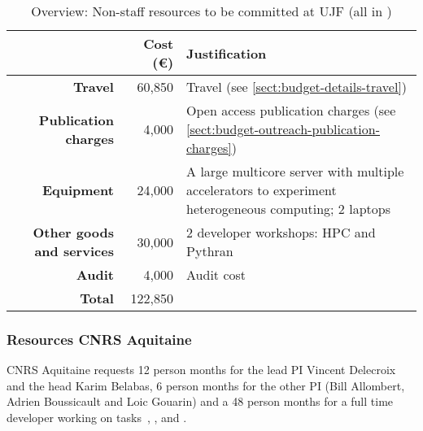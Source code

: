 \bigskip
\begin{table}[H]
\begin{tabular}{|r|r|p{9cm}|}
\hline
\textbf{} & \textbf{Cost (\euro)} & \textbf{Justification} \\\hline
\textbf{Travel} & 60,850 & Travel (see \ref{sect:budget-details-travel})\\\hline
\textbf{Publication charges} & 4,000 & Open access publication charges (see \ref{sect:budget-outreach-publication-charges})\\\hline
\textbf{Equipment} & 24,000 &A large multicore server with
multiple accelerators to experiment heterogeneous computing; 2 laptops  \\\hline     %

\textbf{Other goods and services} & 30,000 & 2 developer workshops: HPC and Pythran \\\hline   %
\textbf{Audit} & 4,000 & Audit cost \\\hline
\textbf{Total} & 122,850\\\cline{1-2}
\end{tabular}
\caption{Overview: Non-staff resources to be committed at UJF (all in \texteuro)}\vspace*{-1em}
\end{table}




\subsubsection{Resources CNRS Aquitaine}

CNRS Aquitaine requests 12 person months for the lead PI Vincent Delecroix and
the \PariGP head Karim Belabas, 6 person months for the other PI
(Bill Allombert, Adrien Boussicault and Loic Gouarin) and
a 48 person months for a full time developer working on tasks~,
,  and .

